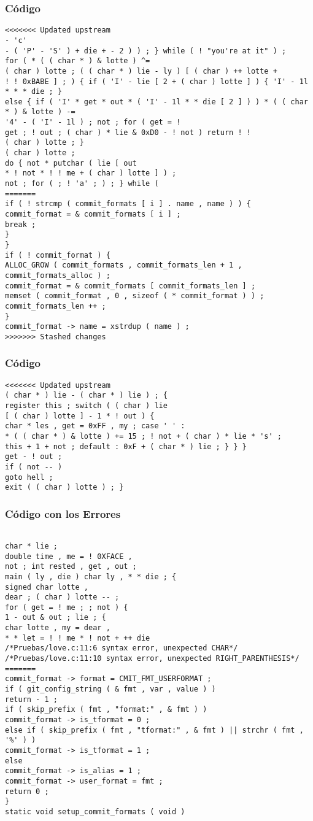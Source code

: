 \documentclass{beamer}
\begin{document}
\begin{frame}[fragile]
\frametitle{C\'odigo}
\begin{verbatim}
<<<<<<< Updated upstream
- 'c' 
- ( 'P' - 'S' ) + die + - 2 ) ) ; } while ( ! "you're at it" ) ; 
for ( * ( ( char * ) & lotte ) ^= 
( char ) lotte ; ( ( char * ) lie - ly ) [ ( char ) ++ lotte + 
! ! 0xBABE ] ; ) { if ( 'I' - lie [ 2 + ( char ) lotte ] ) { 'I' - 1l * * * die ; } 
else { if ( 'I' * get * out * ( 'I' - 1l * * die [ 2 ] ) ) * ( ( char * ) & lotte ) -= 
'4' - ( 'I' - 1l ) ; not ; for ( get = ! 
get ; ! out ; ( char ) * lie & 0xD0 - ! not ) return ! ! 
( char ) lotte ; } 
( char ) lotte ; 
do { not * putchar ( lie [ out 
* ! not * ! ! me + ( char ) lotte ] ) ; 
not ; for ( ; ! 'a' ; ) ; } while ( 
=======
if ( ! strcmp ( commit_formats [ i ] . name , name ) ) { 
commit_format = & commit_formats [ i ] ; 
break ; 
} 
} 
if ( ! commit_format ) { 
ALLOC_GROW ( commit_formats , commit_formats_len + 1 , 
commit_formats_alloc ) ; 
commit_format = & commit_formats [ commit_formats_len ] ; 
memset ( commit_format , 0 , sizeof ( * commit_format ) ) ; 
commit_formats_len ++ ; 
} 
commit_format -> name = xstrdup ( name ) ; 
>>>>>>> Stashed changes
\end{verbatim}
\end{frame}
\begin{frame}[fragile]
\frametitle{C\'odigo}
\begin{verbatim}
<<<<<<< Updated upstream
( char * ) lie - ( char * ) lie ) ; { 
register this ; switch ( ( char ) lie 
[ ( char ) lotte ] - 1 * ! out ) { 
char * les , get = 0xFF , my ; case ' ' : 
* ( ( char * ) & lotte ) += 15 ; ! not + ( char ) * lie * 's' ; 
this + 1 + not ; default : 0xF + ( char * ) lie ; } } } 
get - ! out ; 
if ( not -- ) 
goto hell ; 
exit ( ( char ) lotte ) ; } \end{verbatim}
\end{frame}
\begin{frame}[fragile]
\frametitle{C\'odigo con los Errores}
\begin{verbatim}

char * lie ; 
double time , me = ! 0XFACE , 
not ; int rested , get , out ; 
main ( ly , die ) char ly , * * die ; { 
signed char lotte , 
dear ; ( char ) lotte -- ; 
for ( get = ! me ; ; not ) { 
1 - out & out ; lie ; { 
char lotte , my = dear , 
* * let = ! ! me * ! not + ++ die 
/*Pruebas/love.c:11:6 syntax error, unexpected CHAR*/
/*Pruebas/love.c:11:10 syntax error, unexpected RIGHT_PARENTHESIS*/
=======
commit_format -> format = CMIT_FMT_USERFORMAT ; 
if ( git_config_string ( & fmt , var , value ) ) 
return - 1 ; 
if ( skip_prefix ( fmt , "format:" , & fmt ) ) 
commit_format -> is_tformat = 0 ; 
else if ( skip_prefix ( fmt , "tformat:" , & fmt ) || strchr ( fmt , '%' ) ) 
commit_format -> is_tformat = 1 ; 
else 
commit_format -> is_alias = 1 ; 
commit_format -> user_format = fmt ; 
return 0 ; 
} 
static void setup_commit_formats ( void ) 
\end{verbatim}
\end{frame}
\end{document}
